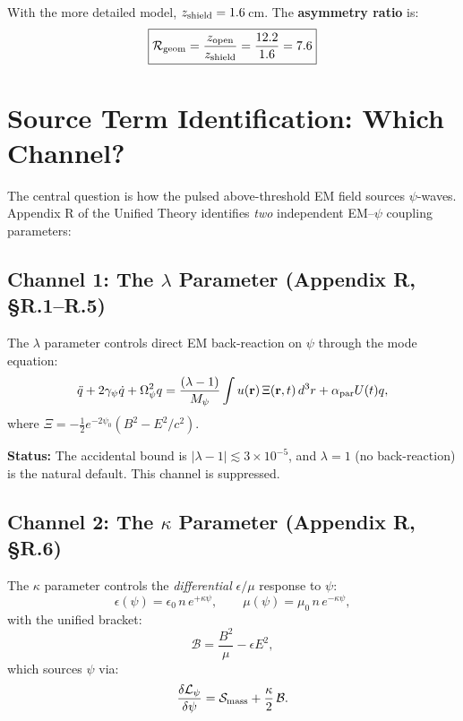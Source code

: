 \documentclass[11pt]{article}
\begin{document}
With the more detailed model, $z_{\rm shield} = 1.6$\,cm. The
\textbf{asymmetry ratio} is:
\begin{equation}\label{eq:asymmetry}
\boxed{\mathcal{R}_{\rm geom} = \frac{z_{\rm open}}{z_{\rm shield}} = \frac{12.2}{1.6} = 7.6}
\end{equation}

\section{Source Term Identification: Which Channel?}\label{sec:source}

The central question is how the pulsed above-threshold EM field sources
$\psi$-waves. Appendix R of the Unified Theory identifies \emph{two}
independent EM--$\psi$ coupling parameters:

\subsection{Channel 1: The $\lambda$ Parameter (Appendix R, \S R.1--R.5)}

The $\lambda$ parameter controls direct EM back-reaction on $\psi$ through
the mode equation:
\begin{equation}
\ddot{q} + 2\gamma_\psi \dot{q} + \Omega_\psi^2 q
  = \frac{(\lambda - 1)}{M_\psi} \int u(\mathbf{r})\,\Xi(\mathbf{r},t)\,d^3r
  + \alpha_{\rm par} U(t) q,
\end{equation}
where $\Xi = -\tfrac{1}{2}e^{-2\psi_0}(B^2 - E^2/c^2)$.

\textbf{Status:} The accidental bound is $|\lambda - 1| \lesssim 3 \times 10^{-5}$,
and $\lambda = 1$ (no back-reaction) is the natural default. This channel is
suppressed.

\subsection{Channel 2: The $\kappa$ Parameter (Appendix R, \S R.6)}

The $\kappa$ parameter controls the \emph{differential} $\epsilon/\mu$ response
to $\psi$:
\begin{equation}
\epsilon(\psi) = \epsilon_0\, n\, e^{+\kappa\psi}, \qquad
\mu(\psi) = \mu_0\, n\, e^{-\kappa\psi},
\end{equation}
with the unified bracket:
\begin{equation}
\mathcal{B} = \frac{B^2}{\mu} - \epsilon E^2,
\end{equation}
which sources $\psi$ via:
\begin{equation}\label{eq:kappa-source}
\frac{\delta \mathcal{L}_\psi}{\delta \psi} = \mathcal{S}_{\rm mass}
  + \frac{\kappa}{2}\,\mathcal{B}.
\end{equation}
\end{document}
